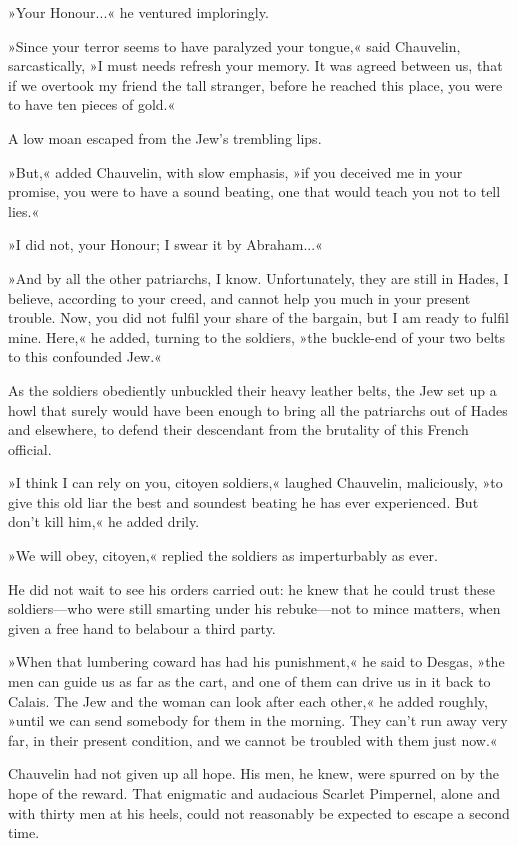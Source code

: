 »Your Honour...« he ventured imploringly.

»Since your terror seems to have paralyzed your tongue,« said Chauvelin, sarcastically, »I must needs refresh your memory. It was agreed between us, that if we overtook my friend the tall stranger, before he reached this place, you were to have ten pieces of gold.«

A low moan escaped from the Jew's trembling lips.

»But,« added Chauvelin, with slow emphasis, »if you deceived me in your promise, you were to have a sound beating, one that would teach you not to tell lies.«

»I did not, your Honour; I swear it by Abraham...«

»And by all the other patriarchs, I know. Unfortunately, they are still in Hades, I believe, according to your creed, and cannot help you much in your present trouble. Now, you did not fulfil your share of the bargain, but I am ready to fulfil mine. Here,« he added, turning to the soldiers, »the buckle-end of your two belts to this confounded Jew.«

As the soldiers obediently unbuckled their heavy leather belts, the Jew set up a howl that surely would have been enough to bring all the patriarchs out of Hades and elsewhere, to defend their descendant from the brutality of this French official.

»I think I can rely on you, citoyen soldiers,« laughed Chauvelin, maliciously, »to give this old liar the best and soundest beating he has ever experienced. But don't kill him,« he added drily.

»We will obey, citoyen,« replied the soldiers as imperturbably as ever.

He did not wait to see his orders carried out: he knew that he could trust these soldiers\allowbreak---\allowbreak who were still smarting under his rebuke\allowbreak---\allowbreak not to mince matters, when given a free hand to belabour a third party.

»When that lumbering coward has had his punishment,« he said to Desgas, »the men can guide us as far as the cart, and one of them can drive us in it back to Calais. The Jew and the woman can look after each other,« he added roughly, »until we can send somebody for them in the morning. They can't run away very far, in their present condition, and we cannot be troubled with them just now.«

Chauvelin had not given up all hope. His men, he knew, were spurred on by the hope of the reward. That enigmatic and audacious Scarlet Pimpernel, alone and with thirty men at his heels, could not reasonably be expected to escape a second time.

